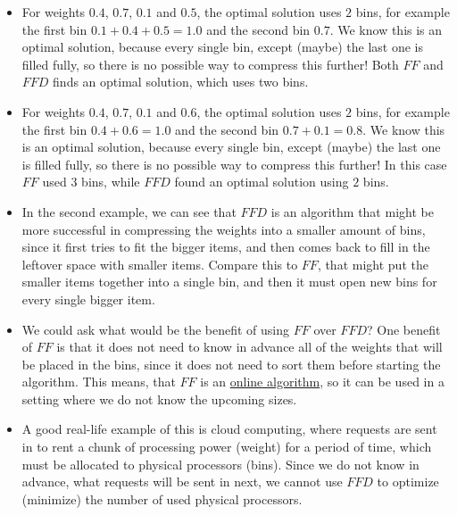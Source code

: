 \begin{itemize}
    \item For weights $0.4$, $0.7$, $0.1$ and $0.5$, the optimal solution uses $2$ bins, for example the first bin $0.1+0.4+0.5=1.0$ and the second bin $0.7$. We know this is an optimal solution, because every single bin, except (maybe) the last one is filled fully, so there is no possible way to compress this further! Both $FF$ and $FFD$ finds an optimal solution, which uses two bins.
    \item For weights $0.4$, $0.7$, $0.1$ and $0.6$, the optimal solution uses $2$ bins, for example the first bin $0.4+0.6=1.0$ and the second bin $0.7+0.1=0.8$. We know this is an optimal solution, because every single bin, except (maybe) the last one is filled fully, so there is no possible way to compress this further! In this case $FF$ used $3$ bins, while $FFD$ found an optimal solution using $2$ bins.
    \item In the second example, we can see that $FFD$ is an algorithm that might be more successful in compressing the weights into a smaller amount of bins, since it first tries to fit the bigger items, and then comes back to fill in the leftover space with smaller items. Compare this to $FF$, that might put the smaller items together into a single bin, and then it must open new bins for every single bigger item.
    \item We could ask what would be the benefit of using $FF$ over $FFD$? One benefit of $FF$ is that it does not need to know in advance all of the weights that will be placed in the bins, since it does not need to sort them before starting the algorithm. This means, that $FF$ is an \href{https://en.wikipedia.org/wiki/Online_algorithm}{online algorithm}, so it can be used in a setting where we do not know the upcoming sizes.
    \item A good real-life example of this is cloud computing, where requests are sent in to rent a chunk of processing power (weight) for a period of time, which must be allocated to physical processors (bins). Since we do not know in advance, what requests will be sent in next, we cannot use $FFD$ to optimize (minimize) the number of used physical processors.
\end{itemize}